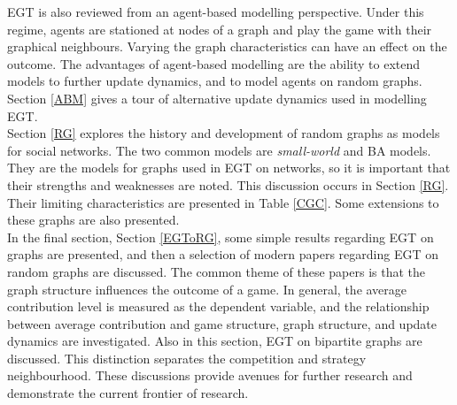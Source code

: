 EGT is also reviewed from an agent-based modelling perspective. Under this regime, agents are stationed at nodes of a graph and play the game with their graphical neighbours. Varying the graph characteristics can have an effect on the outcome. The advantages of agent-based modelling are the ability to extend models to further update dynamics, and to model agents on random graphs. Section \ref{ABM} gives a tour of alternative update dynamics used in modelling EGT. \\


Section \ref{RG} explores the history and development of random graphs as models for social networks. The two common models are \emph{small-world} and BA models. They are the models for graphs used in EGT on networks, so it is important that their strengths and weaknesses are noted. This discussion occurs in Section \ref{RG}. Their limiting characteristics are presented in Table \ref{CGC}. Some extensions to these graphs are also presented. \\

In the final section, Section \ref{EGToRG}, some simple results regarding EGT on graphs are presented, and then a selection of modern papers regarding EGT on random graphs are discussed. The common theme of these papers is that the graph structure influences the outcome of a game. In general, the average contribution level is measured as the dependent variable, and the relationship between average contribution and game structure, graph structure, and update dynamics are investigated. Also in this section, EGT on bipartite graphs are discussed. This distinction separates the competition and strategy neighbourhood. These discussions provide avenues for further research and demonstrate the current frontier of research. \\




